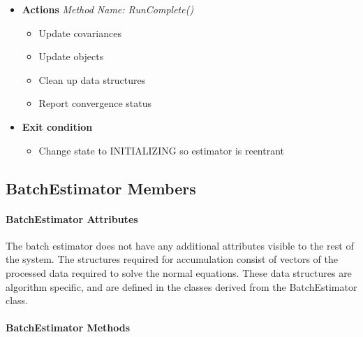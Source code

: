 \begin{description}
\begin{itemize}
\item \textbf{Actions} \textit{Method Name:  RunComplete()}
\begin{itemize}
\item Update covariances
\item Update objects
\item Clean up data structures
\item Report convergence status
\end{itemize}
\item \textbf{Exit condition}
\begin{itemize}
\item Change state to INITIALIZING so estimator is reentrant
\end{itemize}
\end{itemize}
\end{description}

\subsection{BatchEstimator Members}

\paragraph{BatchEstimator Attributes}

The batch estimator does not have any additional attributes visible to the rest of the system.  The structures required for accumulation consist of vectors of the processed data required to solve the normal equations.  These data structures are algorithm specific, and are defined in the classes derived from the BatchEstimator class.

\paragraph{BatchEstimator Methods}

